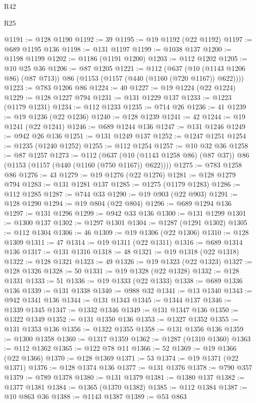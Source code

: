 \begin{lexlean}{R42}
\begin{lexlean}{R25}
\begin{coremodule}
{{{{{{{{{{{{{{{{{{{{{{{{{{{{{{{{{{{{{{{{{{{{{{{{{{{{{{{{{{{{{{{{{{{{{{{{{{{{{{{{{{{{{{{{{{{{{{{{{{{{{{{{{{{{{{{{{{{{{{{{{{{{{{{{{{{{{{{{{{{{{{{{{{{{{{{{{{{{{{{{{{{{{{{{{{{{{{{{{{{{{{{{{{{{{{{{{{{{{{{@1191 := @128 @1190
@1192 := 39
@1195 := @19 @1192 (@22 @1192)
@1197 := @689 @1195 @136
@1198 := @131 @1197
@1199 := @1038 @137
@1200 := @1198 @1199
@1202 := @1186 (@1191 @1200)
@1203 := @112 @1202
@1205 := @10 @25 @36
@1206 := @87 @1205
@1221 := @112
    (@637 (@10 (@1143 @1206 @86) (@87 @713)) @86 (@1153 (@1157 (@440 (@1160 (@720 @1167)) @622))))
@1223 := @783 @1206 @86
@1224 := 40
@1227 := @19 @1224 (@22 @1224)
@1229 := @128 @1227 @794
@1231 := @131 @1229 @137
@1233 := @1223 (@1179 @1231)
@1234 := @112 @1233
@1235 := @714 @26
@1236 := 41
@1239 := @19 @1236 (@22 @1236)
@1240 := @128 @1239
@1241 := 42
@1244 := @19 @1241 (@22 @1241)
@1246 := @689 @1244 @136
@1247 := @131 @1246
@1249 := @942 @26 @136
@1251 := @131 @1249 @137
@1252 := @1247 @1251
@1254 := @1235 (@1240 @1252)
@1255 := @112 @1254
@1257 := @10 @32 @36
@1258 := @87 @1257
@1273 := @112
    (@637 (@10 (@1143 @1258 @86) (@87 @37)) @86 (@1153 (@1157 (@440 (@1160 (@750 @1167)) @622))))
@1275 := @783 @1258 @86
@1276 := 43
@1279 := @19 @1276 (@22 @1276)
@1281 := @128 @1279 @794
@1283 := @131 @1281 @137
@1285 := @1275 (@1179 @1283)
@1286 := @112 @1285
@1287 := @744 @33
@1290 := @19 @903 (@22 @903)
@1291 := @128 @1290
@1294 := @19 @804 (@22 @804)
@1296 := @689 @1294 @136
@1297 := @131 @1296
@1299 := @942 @33 @136
@1300 := @131 @1299
@1301 := @1300 @137
@1302 := @1297 @1301
@1304 := @1287 (@1291 @1302)
@1305 := @112 @1304
@1306 := 46
@1309 := @19 @1306 (@22 @1306)
@1310 := @128 @1309
@1311 := 47
@1314 := @19 @1311 (@22 @1311)
@1316 := @689 @1314 @136
@1317 := @131 @1316
@1318 := 48
@1321 := @19 @1318 (@22 @1318)
@1322 := @128 @1321
@1323 := 49
@1326 := @19 @1323 (@22 @1323)
@1327 := @128 @1326
@1328 := 50
@1331 := @19 @1328 (@22 @1328)
@1332 := @128 @1331
@1333 := 51
@1336 := @19 @1333 (@22 @1333)
@1338 := @689 @1336 @136
@1339 := @131 @1338
@1340 := @988 @32
@1341 := @13 @1340
@1343 := @942 @1341 @136
@1344 := @131 @1343
@1345 := @1344 @137
@1346 := @1339 @1345
@1347 := @1332 @1346
@1349 := @131 @1347 @136
@1350 := @1322 @1349
@1352 := @131 @1350 @136
@1353 := @1327 @1352
@1355 := @131 @1353 @136
@1356 := @1322 @1355
@1358 := @131 @1356 @136
@1359 := @1300 @1358
@1360 := @1317 @1359
@1362 := @1287 (@1310 @1360)
@1363 := @112 @1362
@1365 := @122 @78 @11
@1366 := 52
@1369 := @19 @1366 (@22 @1366)
@1370 := @128 @1369
@1371 := 53
@1374 := @19 @1371 (@22 @1371)
@1376 := @128 @1374 @136
@1377 := @131 @1376
@1378 := @790 @357
@1379 := @789 @1378
@1380 := @131 @1379
@1381 := @1380 @137
@1382 := @1377 @1381
@1384 := @1365 (@1370 @1382)
@1385 := @112 @1384
@1387 := @10 @863 @36
@1388 := @1143 @1387
@1389 := @53 @863
}}}}}}}}}}}}}}}}}}}}}}}}}}}}}}}}}}}}}}}}}}}}}}}}}}}}}}}}}}}}}}}}}}}}}}}}}}}}}}}}}}}}}}}}}}}}}}}}}}}}}}}}}}}}}}}}}}}}}}}}}}}}}}}}}}}}}}}}}}}}}}}}}}}}}}}}}}}}}}}}}}}}}}}}}}}}}}}}}}}}}}}}}}}}}}}}}}}}}}}
\end{coremodule}
\end{lexlean}
\end{lexlean}
